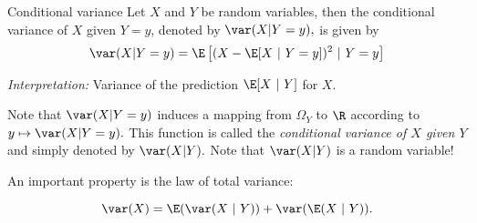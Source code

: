 \documentclass[11pt,compress,t,notes=noshow, xcolor=table]{beamer}
\begin{document}
\begin{frame}[t]{Conditional variance} 
	Let $X$ and $Y$ be random variables, then the conditional variance of $X$ given $Y=y$, denoted by $\var(X|Y=y),$ is given by
	$$	\var(X|Y=y)  = \E \left[ (X - \E[X~|~Y=y])^2  ~|~ Y=y  \right]	$$
	
	\emph{Interpretation:} Variance of the prediction $\E[X~|~Y]$ for $X.$
	\lz
	
	Note that $\var(X|Y=y)$ induces a mapping from $\Omega_Y$ to $\R$ according to $y \mapsto \var(X|Y=y).$
	This function is called the \emph{conditional variance of $X$ given $Y$} and simply denoted by $\var(X|Y).$
	Note that $\var(X|Y)$ is a random variable!
	
	\lz
	
	An important property is the law of total variance:
	
	$$  \var(X) = \E(\var(X~|~Y)) + \var(\E(X~|~Y)).  $$

	
\end{frame}




\endlecture
\end{document}

